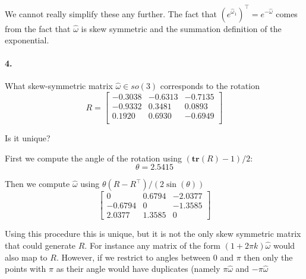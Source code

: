 \documentclass[english]{article}
\begin{document}
We cannot really simplify these any further. The fact that
$(e^{\hat{\omega}_1})^\top = e^{-\hat{\omega}}$ comes from the fact that $\hat{\omega}$ is
skew symmetric and the summation definition of the exponential.


\paragraph{4.} 
What skew-symmetric matrix $\hat{\omega} \in so(3)$ corresponds to the rotation
\begin{equation*}
R= \begin{bmatrix}
   -0.3038 &  -0.6313 & -0.7135\\
   -0.9332  &  0.3481   & 0.0893\\
    0.1920   & 0.6930 &  -0.6949\\
\end{bmatrix}
\end{equation*}


Is it unique?


First we compute the angle of the rotation using $(\mathbf{tr}(R)-1)/2$:
\[ \theta = 2.5415 \]

Then we compute $\hat{\omega}$ using $\theta (R - R^\top)/(2 \sin(\theta))$
\[ \begin{bmatrix}
         0  &  0.6794 &  -2.0377 \\
   -0.6794  &       0 &  -1.3585 \\
    2.0377  &  1.3585 &        0
  \end{bmatrix}
\]

Using this procedure this is unique, but it is not the only skew symmetric matrix that could generate $R$. For instance any matrix of the form $(1+2 \pi k) \hat{\omega}$ would also map to $R$. However, if we restrict to angles between $0$ and $\pi$ then only the points with $\pi$ as their angle would have duplicates (namely $\pi\hat{\omega}$ and $-\pi \hat{\omega}$

%
%
\end{document}
